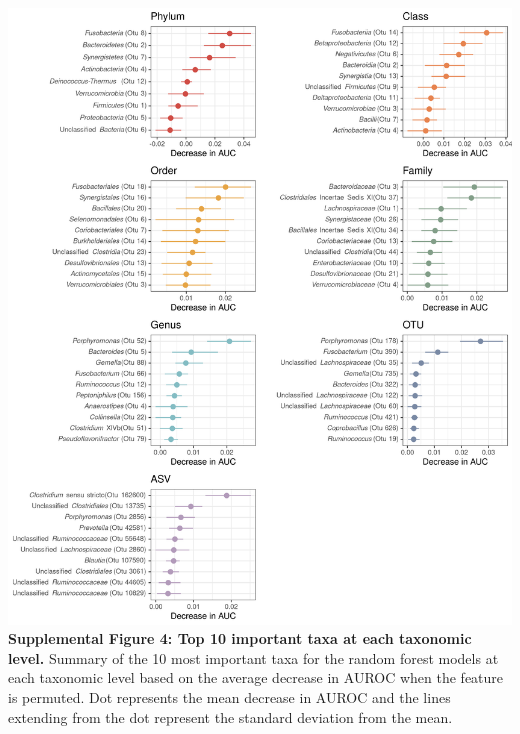 \documentclass[
]{article}
\begin{document}
\includegraphics[width=\textwidth,height=0.85\textheight]{figure_s4.png}\\
\textbf{Supplemental Figure 4: Top 10 important taxa at each taxonomic
level.} Summary of the 10 most important taxa for the random forest
models at each taxonomic level based on the average decrease in AUROC
when the feature is permuted. Dot represents the mean decrease in AUROC
and the lines extending from the dot represent the standard deviation
from the mean.
\end{document}
